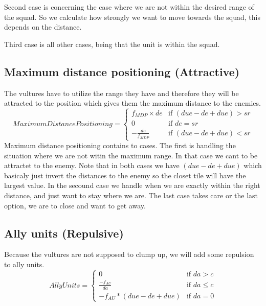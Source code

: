 		Second case  is concerning the case where we are not within the desired range of the squad. So we calculate how strongly we want to move towards the squad, this depends on the distance. 
		
		Third case is all other cases, being that the unit is within the squad.
					
	\subsection*{Maximum distance positioning (Attractive)}
		The vultures have to utilize the range they have and therefore they will be attracted to the position which gives them the maximum distance 
		to the enemies.
		\begin{displaymath}
			MaximumDistancePositioning = \begin{cases}
					f_{MDP} \times de & \text{if } (due - de + due) > sr\\
					0 & \text{if } de = sr\\
					- \frac{de}{f_{MDP}} & \text{if } (due - de + due) < sr
				\end{cases}		
		\end{displaymath}
		Maximum distance positioning contains to cases. The first is handling the situation where we are not witin the maximum range. In that case we cant to be attractet to the enemy. Note that in both cases we have $(due - de + due)$ which basicaly just invert the distances to the enemy so the closet tile will have the largest value.
		In the secound case we handle when we are exactly within the right distance, and just want to stay where we are.
		The last case takes care or the last option, we are to close and want to get away.
		
		
		
	\subsection*{Ally units (Repulsive)}
		Because the vultures are not supposed to clump up, we will add some repulsion to ally units.
		\begin{displaymath}
			AllyUnits = \begin{cases}
					0 & \text{if } da > c\\
					\frac{-f_{AU}}{da} & \text{if } da \leq c\\
					-f_{AU} * (due - de + due) & \text{if } da = 0
				\end{cases}		
		\end{displaymath}
